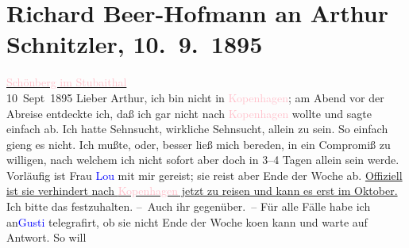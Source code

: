 

               \section[Richard Beer-Hofmann an Arthur Schnitzler, 10. 9. 1895]{ Richard Beer-Hofmann an Arthur Schnitzler,
               10. 9. 1895}\nopagebreak{}\rehead{ }\normalsize\beginnumbering{} \toendnotes[C]{\smallbreak\pagebreak[2]} 
\pstart
           \raggedleft{}{\pb}\uline{\textcolor{pink}{Schönberg im
                        Stubaithal}{}\ledrightnote{\textcolor{pink}{Schönberg im Stubaital}}}{\\}10 Sept 1895\pend
           \pstart
           Lieber Arthur, ich bin nicht in \textcolor{pink}{Kopenhagen}{}\ledrightnote{\textcolor{pink}{Kopenhagen}}; am Abend vor der Abreise entdeckte ich, daß ich gar nicht nach
                  \textcolor{pink}{Kopenhagen}{}\ledrightnote{\textcolor{pink}{Kopenhagen}} wollte und sagte einfach ab. Ich
               hatte Sehnsucht, wirkliche Sehnsucht, allein zu sein. So einfach gieng es nicht. Ich
               mußte, oder, besser ließ mich bereden, in ein Compromiß zu willigen,  nach welchem ich nicht sofort aber doch in 3–4
               Tagen allein sein werde. Vorläufig ist {\pb}Frau \textcolor{blue}{Lou}{}\ledrightnote{\textcolor{blue}{Lou Andreas-Salomé}} mit mir gereist; sie reist aber Ende der Woche ab. \uline{Offiziell ist sie verhindert nach \textcolor{pink}{Kopenhagen}{}\ledrightnote{\textcolor{pink}{Kopenhagen}} jetzt zu reisen und kann es erst im Oktober.} Ich bitte
               das festzuhalten.\pend
           \pstart
           – Auch ihr gegenüber. –\pend
           \pstart
           Für alle Fälle habe ich \introOben{}an\introOben{}{ }\textcolor{blue}{Gusti}{}\ledrightnote{\textcolor{blue}{Auguste Chlum}} telegrafirt, ob sie nicht
               Ende der Woche ko{\geminationm}en kann und warte auf Antwort. So will

